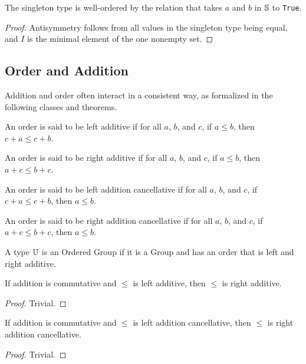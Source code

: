 \documentclass[../../math.tex]{subfiles}
\begin{document}
\begin{instance}
    The singleton type is well-ordered by the relation that takes $a$ and $b$ in
    $\S$ to \verb|True|.
\end{instance}
\begin{proof}
    Antisymmetry follows from all values in the singleton type being equal, and
    $I$ is the minimal element of the one nonempty set.
\end{proof}

\subsection{Order and Addition}

Addition and order often interact in a consistent way, as formalized in the
following classes and theorems.

\begin{class}
    An order is said to be left additive if for all $a$, $b$, and $c$, if $a
    \leq b$, then $c + a \leq c + b$.
\end{class}

\begin{class}
    An order is said to be right additive if for all $a$, $b$, and $c$, if $a
    \leq b$, then $a + c \leq b + c$.
\end{class}

\begin{class}
    An order is said to be left addition cancellative if for all $a$, $b$, and
    $c$, if $c + a \leq c + b$, then $a \leq b$.
\end{class}

\begin{class}
    An order is said to be right addition cancellative if for all $a$, $b$, and
    $c$, if $a + c \leq b + c$, then $a \leq b$.
\end{class}

\begin{class}
    A type $\U$ is an Ordered Group if it is a Group and has an order that is
    left and right additive.
\end{class}

\begin{instance}
    If addition is commutative and $\leq$ is left additive, then $\leq$ is right
    additive.
\end{instance}
\begin{proof}
    Trivial.
\end{proof}

\begin{instance}
    If addition is commutative and $\leq$ is left addition cancellative, then
    $\leq$ is right addition cancellative.
\end{instance}
\begin{proof}
    Trivial.
\end{proof}
\end{document}
